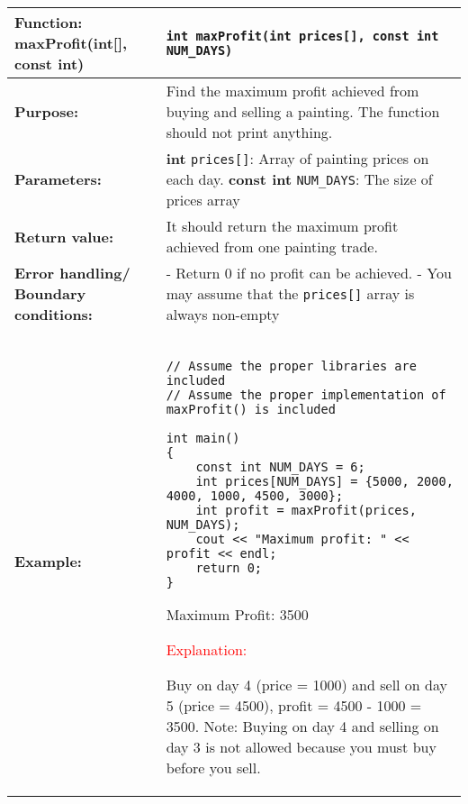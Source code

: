 \begin{longtable}[H]{|p{1.7in}|p{4.0in}|} \hline
        \textbf{Function:} \newline 
        maxProfit(int[], const int) & \texttt{int maxProfit(int prices[], const int NUM_DAYS)}
        \\ \hline
        \textbf{Purpose:}  & Find the maximum profit achieved from buying and selling a painting. The function should not print anything. \\ \hline
        \textbf{Parameters:} &  
        \textbf{int} \texttt{prices[]}: Array of painting prices on each day. \newline
        \textbf{const int} \texttt{NUM\_DAYS}: The size of prices array
\\ \hline
        \textbf{Return value:} &  It should return the maximum profit achieved from one painting trade. \\ \hline
        \textbf{Error handling/} \newline
        \textbf{Boundary conditions:} & - Return 0 if no profit can be achieved. 
        \newline - You may assume that the \texttt{prices[]} array is always non-empty
        \\ \hline 
        \textbf{Example:} & 
        \begin{example}
        \begin{verbatim}
        
// Assume the proper libraries are included
// Assume the proper implementation of maxProfit() is included

int main()
{
    const int NUM_DAYS = 6;
    int prices[NUM_DAYS] = {5000, 2000, 4000, 1000, 4500, 3000};
    int profit = maxProfit(prices, NUM_DAYS);
    cout << "Maximum profit: " << profit << endl;
    return 0;
}
        \end{verbatim}
        \end{example}

        \begin{sample}
Maximum Profit: 3500
        \end{sample}

        \textcolor{red}{Explanation:} 
        
        Buy on day 4 (price = 1000) and sell on day 5 (price = 4500), profit = 4500 - 1000 = 3500.
\newline Note: Buying on day 4 and selling on day 3 is not allowed because you must buy before you sell.

             \\ \hline
\end{longtable}

